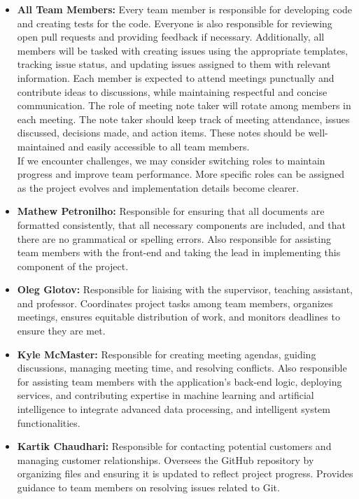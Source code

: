 \documentclass{article}
\begin{document}
\begin{itemize}
	\item \textbf{All Team Members:} Every team member is responsible for developing code and creating tests for the code. Everyone is also responsible for reviewing open 
  pull requests and providing feedback if necessary. Additionally, all members will be tasked with creating issues using the appropriate templates, tracking issue status, 
  and updating issues assigned to them with relevant information. Each member is expected to attend meetings punctually and contribute ideas to discussions, while 
  maintaining respectful and concise communication. The role of meeting note taker will rotate among members in each meeting. The note taker should keep track of meeting attendance,
   issues discussed, decisions made, and action items. These notes should be well-maintained and easily accessible to all team members.
    \\ If we encounter challenges, we may consider switching roles to maintain progress and improve team performance. More specific roles can be assigned as the project evolves 
    and implementation details become clearer.
    \item \textbf{Mathew Petronilho:}
    Responsible for ensuring that all documents are formatted consistently, that all necessary components are included, and that there are no grammatical or spelling errors. 
    Also responsible for assisting team members with the front-end and taking the lead in implementing this component of the project.

    \item \textbf{Oleg Glotov:} Responsible for liaising with the supervisor, teaching assistant, and professor. 
    Coordinates project tasks among team members, organizes meetings, ensures equitable distribution of work, and monitors deadlines to ensure they are met.
    
    \item \textbf{Kyle McMaster:} Responsible for creating meeting agendas, guiding discussions, managing meeting time, and resolving conflicts. 
    Also responsible for assisting team members with the application's back-end logic, deploying services, and contributing expertise in machine learning and artificial intelligence 
    to integrate advanced data processing, and intelligent system functionalities.
    
    \item \textbf{Kartik Chaudhari:} Responsible for contacting potential customers and managing customer relationships. 
    Oversees the GitHub repository by organizing files and ensuring it is updated to reflect project progress. Provides guidance to team members on resolving issues related to Git.
    
\end{itemize}
\end{document}
